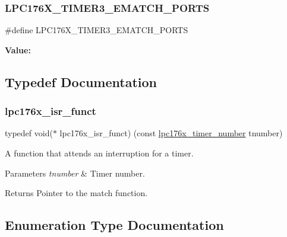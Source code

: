 \subsubsection{\texorpdfstring{LPC176X\_TIMER3\_EMATCH\_PORTS}{LPC176X\_TIMER3\_EMATCH\_PORTS}}
{\footnotesize\ttfamily \#define L\+P\+C176\+X\+\_\+\+T\+I\+M\+E\+R3\+\_\+\+E\+M\+A\+T\+C\+H\+\_\+\+P\+O\+R\+TS}

{\bfseries Value\+:}
\begin{DoxyCode}{0}

\end{DoxyCode}


\subsection{Typedef Documentation}
\mbox{\label{timer-defs_8h_a0fc7ef6ba56b5d2439fa6d48f745c9fc}} 
\subsubsection{\texorpdfstring{lpc176x\_isr\_funct}{lpc176x\_isr\_funct}}
{\footnotesize\ttfamily typedef void($\ast$ lpc176x\+\_\+isr\+\_\+funct) (const \mbox{\hyperlink{timer-defs_8h_a23c6cc7925b3e04973ecb1cc9f3706d1}{lpc176x\+\_\+timer\+\_\+number}} tnumber)}



A function that attends an interruption for a timer. 


\begin{DoxyParams}{Parameters}
{\em tnumber} & Timer number. \\
\hline
\end{DoxyParams}
\begin{DoxyReturn}{Returns}
Pointer to the match function. 
\end{DoxyReturn}


\subsection{Enumeration Type Documentation}
\mbox{\label{timer-defs_8h_a8f368b1550601e769c7a734d7c7c11a1}} 
